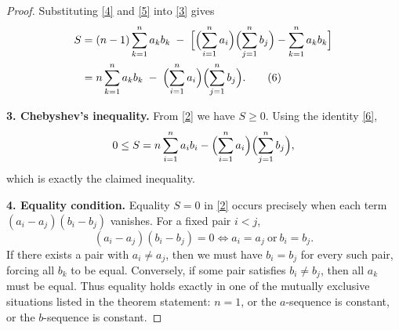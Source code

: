 \begin{proof}
Substituting \eqref{4} and \eqref{5} into \eqref{3} gives
\begin{align}
S &= (n-1)\sum_{k=1}^{n} a_k b_k
     \;-\;\Bigl[\Bigl(\sum_{i=1}^{n}a_i\Bigr)\Bigl(\sum_{j=1}^{n}b_j\Bigr)
            -\sum_{k=1}^{n} a_k b_k\Bigr] \\
  &= n\sum_{k=1}^{n} a_k b_k
     \;-\;
     \Bigl(\sum_{i=1}^{n}a_i\Bigr)\Bigl(\sum_{j=1}^{n}b_j\Bigr). \tag{6}
\end{align}

\medskip

\textbf{3. Chebyshev’s inequality.}  
From \eqref{2} we have \(S\ge0\).  Using the identity \eqref{6},
\[
0\le S = n\sum_{i=1}^{n} a_i b_i 
          -\Bigl(\sum_{i=1}^{n}a_i\Bigr)\Bigl(\sum_{j=1}^{n}b_j\Bigr),
\]
which is exactly the claimed inequality.

\medskip

\textbf{4. Equality condition.}  
Equality \(S=0\) in \eqref{2} occurs precisely when each term \((a_i-a_j)(b_i-b_j)\) vanishes.  
For a fixed pair \(i<j\),
\[
(a_i-a_j)(b_i-b_j)=0 \iff a_i=a_j\ \text{or}\ b_i=b_j .
\]
If there exists a pair with \(a_i\neq a_j\), then we must have \(b_i=b_j\) for every such pair, forcing all \(b_k\) to be equal.  
Conversely, if some pair satisfies \(b_i\neq b_j\), then all \(a_k\) must be equal.  
Thus equality holds exactly in one of the mutually exclusive situations listed in the theorem statement:
\(n=1\), or the \(a\)-sequence is constant, or the \(b\)-sequence is constant.

\end{proof}